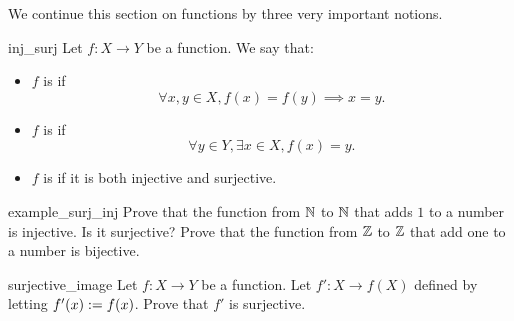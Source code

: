 We continue this section on functions by three very important notions.

\begin{cdef}{}{inj_surj}
    Let \( f : X \to Y \) be a function. We say that:
    \begin{itemize}
        \item \( f \) is  if 
        \begin{equation*}
            \forall x, y \in X, f(x) = f(y) \implies x = y. 
        \end{equation*}
        \item \( f \) is  if
        \begin{equation*}
            \forall y \in Y, \exists x \in X, f(x) = y.    
        \end{equation*}
        \item \( f \) is  if it is both injective and surjective.
    \end{itemize} 
\end{cdef}

\begin{cex}{}{example_surj_inj}
    Prove that the function from \( \mathbb{N} \) to \( \mathbb{N} \) that adds \( 1 \) to a number is injective. Is it surjective? Prove that the function from \( \mathbb{Z} \) to \( \mathbb{Z} \) that add one to a number is bijective. 
\end{cex}
\begin{cex}{}{surjective_image}
    Let \( f : X \to Y \) be a function. Let \( f' : X \to f(X) \) defined by letting \( f'(x) := f(x) \). Prove that \( f' \) is surjective.
\end{cex}

